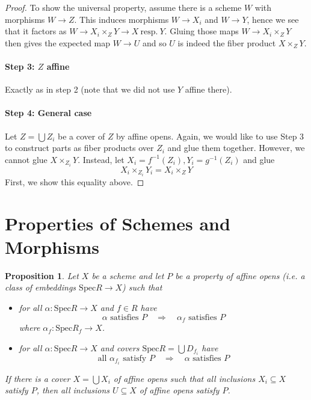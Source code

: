\documentclass{scrartcl}
\newcommand{\Spec}{\mathrm{Spec}}
\newtheorem{prop}{Proposition}[section]
\theoremstyle{definition}
\begin{document}
\begin{proof}
    To show the universal property, assume there is a scheme $W$ with morphisms $W \to Z$.
    This induces morphisms $W \to X_i$ and $W \to Y$, hence we see that it factors as $W \to X_i \times_Z Y \to X \ \text{resp.} \ Y$.
    Gluing those maps $W \to X_i \times_Z Y$ then gives the expected map $W \to U$ and so $U$ is indeed the fiber product $X \times_Z Y$.

    \paragraph{Step 3: $Z$ affine} Exactly as in step 2 (note that we did not use $Y$ affine there).

    \paragraph{Step 4: General case} Let $Z = \bigcup Z_i$ be a cover of $Z$ by affine opens.
    Again, we would like to use Step 3 to construct parts as fiber products over $Z_i$ and glue them together.
    However, we cannot glue $X \times_{Z_i} Y$.
    Instead, let $X_i = f^{-1}(Z_i), Y_i = g^{-1}(Z_i)$ and glue
    \begin{equation*}
        X_i \times_{Z_i} Y_i = X_i \times_Z Y
    \end{equation*}
    First, we show this equality above.

\end{proof}

\section{Properties of Schemes and Morphisms}

\begin{prop}
    \label{prop:affine_local_property}
    Let $X$ be a scheme and let $P$ be a property of affine opens (i.e. a class of embeddings $\Spec R \to X$) such that
    \begin{itemize}
        \item for all $\alpha: \Spec R \to X$ and $f \in R$ have
        \begin{equation*}
           \text{$\alpha$ satisfies $P$} \quad \Rightarrow \quad \text{$\alpha_f$ satisfies $P$}
        \end{equation*}
        where $\alpha_f: \Spec R_f \to X$.
        \item for all $\alpha: \Spec R \to X$ and covers $\Spec R = \bigcup D_{f_i}$ have
        \begin{equation*}
            \text{all $\alpha_{f_i}$ satisfy $P$} \quad \Rightarrow \quad \text{$\alpha$ satisfies $P$}
        \end{equation*}
    \end{itemize}
    If there is a cover $X = \bigcup X_i$ of affine opens such that all inclusions $X_i \subseteq X$ satisfy $P$, then all inclusions $U \subseteq X$ of affine opens satisfy $P$.
\end{prop}
\end{document}
